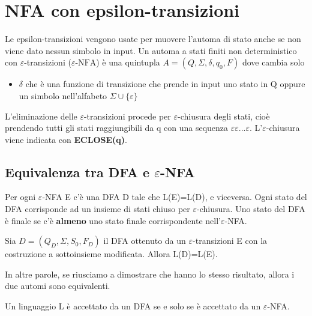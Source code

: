 \chapter{NFA con epsilon-transizioni}
Le epsilon-transizioni vengono usate per muovere l'automa di stato anche se non
viene dato nessun simbolo in input.
Un automa a stati finiti non deterministico con $\varepsilon$\textrm{-transizioni} ($
\varepsilon\textrm{-NFA}$)
è una quintupla $A=(Q, \Sigma, \delta, q_0, F)$ dove cambia solo

\begin{itemize}
\item \textbf{$\delta$} che è una funzione di transizione che prende in input uno 
stato in Q oppure un simbolo nell'alfabeto $\Sigma \cup \{\varepsilon\}$
\end{itemize}

L'eliminazione delle $\varepsilon$-transizioni procede per $\varepsilon$-chiusura 
degli stati, cioè prendendo tutti gli stati raggiungibili da q con una sequenza $
\varepsilon\varepsilon... \varepsilon$. L'$\varepsilon$-chiusura viene indicata con 
\textbf{ECLOSE(q)}.

\section{Equivalenza tra DFA e $\varepsilon$\textrm{-NFA}}
Per ogni $\varepsilon$\textrm{-NFA} E c'è una DFA D tale che L(E)=L(D), e viceversa.
Ogni stato del DFA corrisponde ad un insieme di stati chiuso per 
$\varepsilon$\textrm{-chiusura}.
Uno stato del DFA è finale se c'è \textbf{almeno} uno stato finale corrispondente 
nell'$\varepsilon$\textrm{-NFA}.


\begin{thm}
Sia $D=(Q_D, \Sigma, S_0, F_D)$ il DFA ottenuto da un $\varepsilon$\textrm{-transizioni}
E con la costruzione a sottoinsieme modificata. Allora L(D)=L(E).
\end{thm}

In altre parole, se riusciamo a dimostrare che hanno lo stesso risultato, allora i due
automi sono equivalenti.

\begin{thm}
Un linguaggio L è accettato da un DFA se e solo se è accettato da un 
$\varepsilon$\textrm{-NFA}.
\end{thm}